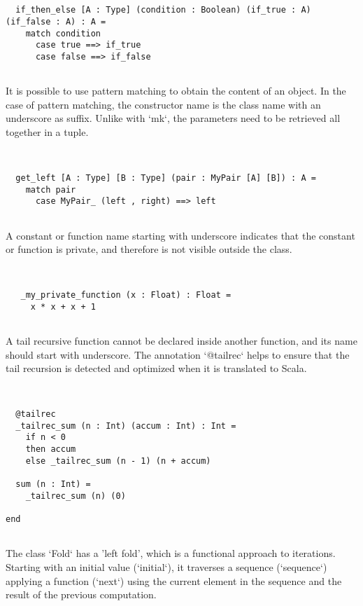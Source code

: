 \documentclass[12pt,a4paper]{article}
\begin{document}
\begin{lstlisting}


  if_then_else [A : Type] (condition : Boolean) (if_true : A) (if_false : A) : A =
    match condition
      case true ==> if_true
      case false ==> if_false


\end{lstlisting}

  It is possible to use pattern matching to obtain the content of an object.
   In the case of pattern matching, the constructor name is the class name with an underscore
   as suffix.
   Unlike with `mk`, the parameters need to be retrieved all together in a tuple.


\begin{lstlisting}


  get_left [A : Type] [B : Type] (pair : MyPair [A] [B]) : A =
    match pair
      case MyPair_ (left , right) ==> left


\end{lstlisting}

  A constant or function name starting with underscore indicates that the constant or
   function is private, and therefore is not visible outside the class.


\begin{lstlisting}


   _my_private_function (x : Float) : Float =
     x * x + x + 1


\end{lstlisting}

  A tail recursive function cannot be declared inside another function, and its name should
   start with underscore. The annotation `@tailrec` helps to ensure that the tail recursion
   is detected and optimized when it is translated to Scala.


\begin{lstlisting}


  @tailrec
  _tailrec_sum (n : Int) (accum : Int) : Int =
    if n < 0
    then accum
    else _tailrec_sum (n - 1) (n + accum)

  sum (n : Int) =
    _tailrec_sum (n) (0)

end


\end{lstlisting}

The class `Fold` has a 'left fold', which is a functional approach to iterations. Starting
 with an initial value (`initial`), it traverses a sequence (`sequence`) applying a function
 (`next`) using the current element in the sequence and the result of the previous
 computation.
\end{document}
